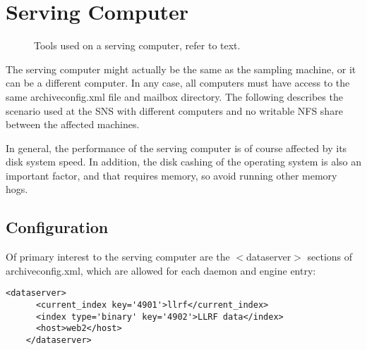 \section{Serving Computer}  \label{sec:exampleServe}
\begin{figure}[htb]
\begin{center}
\end{center}
\caption{\label{fig:acServe}Tools used on a serving computer, refer to text.}
\end{figure}

\noindent The serving computer might actually be the same as the
sampling machine, or it can be a different computer. In any case, all
computers must have access to the same archiveconfig.xml file and
mailbox directory.
The following describes the scenario used at the SNS with 
different computers and no writable NFS share between the
affected machines.

In general, the performance of the serving computer is of course
affected by its disk system speed. In addition, the disk cashing of
the operating system is also an important factor, and that requires
memory, so avoid running other memory hogs.

\subsection{Configuration}
Of primary interest to the serving computer are the $<$dataserver$>$
sections of archiveconfig.xml, which are allowed for each daemon and
engine entry:

\begin{lstlisting}[frame=none,keywordstyle=\sffamily]
    <dataserver>
      <current_index key='4901'>llrf</current_index>
      <index type='binary' key='4902'>LLRF data</index>
      <host>web2</host>
    </dataserver>
\end{lstlisting}

